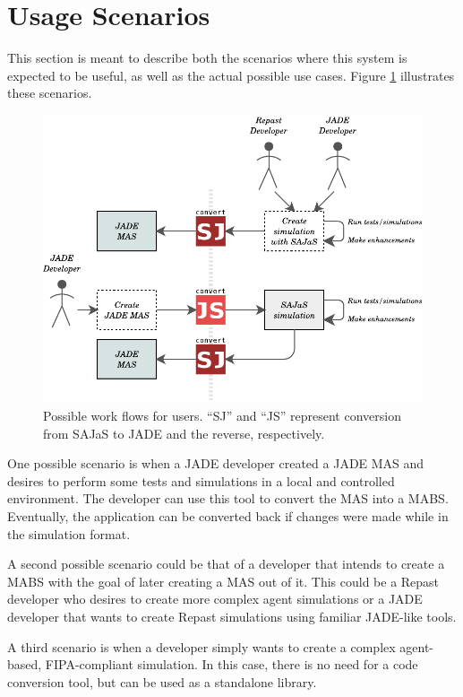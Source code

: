 \section{Usage Scenarios}
\label{sec:solution-scenarios}
This section is meant to describe both the scenarios where this system is expected to be useful, as well as the actual possible use cases. Figure \ref{fig:prototypeFlow} illustrates these scenarios.

\begin{figure}
	\centering
	\includegraphics[width=\linewidth]{figures/prototypeFlow.pdf}
	\caption{
		Possible work flows for \apiname{} users. ``SJ'' and ``JS'' represent conversion from SAJaS to JADE and the reverse, respectively.
	}
	\label{fig:prototypeFlow}
\end{figure}

One possible scenario is when a JADE developer created a JADE MAS and desires to perform some tests and simulations in a local and controlled environment. The developer can use this tool to convert the MAS into a MABS. Eventually, the application can be converted back if changes were made while in the simulation format.

A second possible scenario could be that of a developer that intends to create a MABS with the goal of later creating a MAS out of it. This could be a Repast developer who desires to create more complex agent simulations or a JADE developer that wants to create Repast simulations using familiar JADE-like tools.

A third scenario is when a developer simply wants to create a complex agent-based, FIPA-compliant simulation. In this case, there is no need for a code conversion tool, but \apiname{} can be used as a standalone library.

